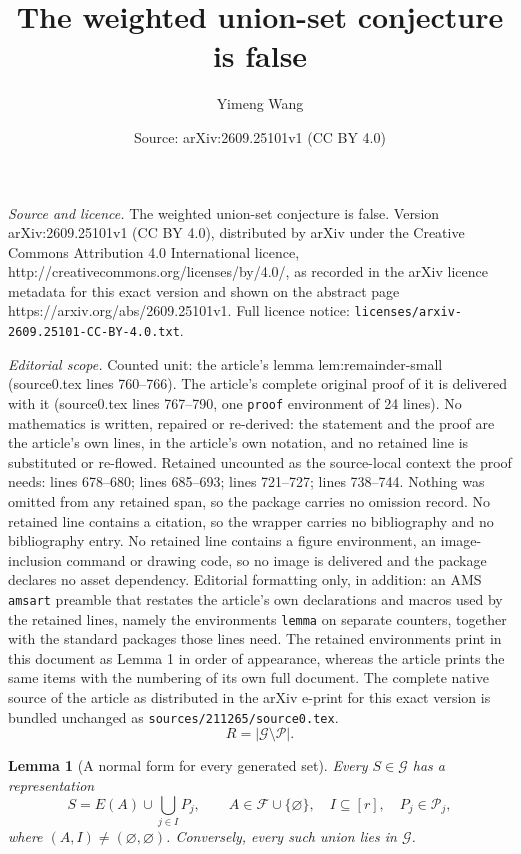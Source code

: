 \documentclass[10pt,a4paper]{amsart}
\title{The weighted union-set conjecture is false}
\author{Yimeng Wang}
\date{Source: arXiv:2609.25101v1 (CC BY 4.0)}
\newtheorem{lemma}{Lemma}
\newcommand{\F}{\mathcal{F}}
\newcommand{\G}{\mathcal{G}}
\newcommand{\Pp}{\mathcal{P}}
\begin{document}
\maketitle

\noindent\emph{Source and licence.} The weighted union-set conjecture is false. Version arXiv:2609.25101v1 (CC BY 4.0), distributed by arXiv under the Creative Commons Attribution 4.0 International licence, http://creativecommons.org/licenses/by/4.0/, as recorded in the arXiv licence metadata for this exact version and shown on the abstract page https://arxiv.org/abs/2609.25101v1. Full licence notice: \texttt{licenses/arxiv-2609.25101-CC-BY-4.0.txt}.\par\smallskip

\noindent\textit{Editorial scope.} Counted unit: the article's lemma lem:remainder-small (source0.tex lines 760--766). The article's complete original proof of it is delivered with it (source0.tex lines 767--790, one \texttt{proof} environment of 24 lines). No mathematics is written, repaired or re-derived: the statement and the proof are the article's own lines, in the article's own notation, and no retained line is substituted or re-flowed.  Retained uncounted as the source-local context the proof needs: lines 678--680; lines 685--693; lines 721--727; lines 738--744.  Nothing was omitted from any retained span, so the package carries no omission record.  No retained line contains a citation, so the wrapper carries no bibliography and no bibliography entry.  No retained line contains a figure environment, an image-inclusion command or drawing code, so no image is delivered and the package declares no asset dependency.  Editorial formatting only, in addition: an AMS \texttt{amsart} preamble that restates the article's own declarations and macros used by the retained lines, namely the environments \texttt{lemma} on separate counters, together with the standard packages those lines need.  The retained environments print in this document as Lemma 1 in order of appearance, whereas the article prints the same items with the numbering of its own full document.  The complete native source of the article as distributed in the arXiv e-print for this exact version is bundled unchanged as \texttt{sources/211265/source0.tex}.
\begin{equation}\label{eq:remainder}
 R=|\G\setminus\Pp|.
\end{equation}

\begin{lemma}[A normal form for every generated set]\label{lem:normal-form}
Every $S\in\G$ has a representation
\begin{equation}\label{eq:normal-form}
 S=E(A)\cup\bigcup_{j\in I}P_j,
 \qquad A\in\F\cup\{\varnothing\},\quad I\subseteq[r],\quad P_j\in\Pp_j,
\end{equation}
where $(A,I)\ne(\varnothing,\varnothing)$. Conversely, every such union lies
in $\G$.
\end{lemma}
\end{document}
